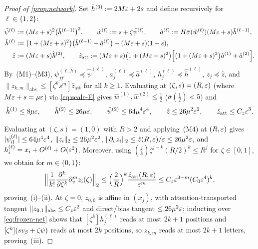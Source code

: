 \begin{proof}[Proof of \cref{prop:network}]
Set $\hat h^{(0)} := 2M\varepsilon + 2s$ and define recursively for $\ell \in \{1,2\}$:
\begin{align*}
  \hat\psi^{(\ell)} &:= (M\varepsilon + s)^2\bigl(\hat h^{(\ell-1)}\bigr)^2, \qquad
  \hat w^{(\ell)} := s + \zeta\hat\psi^{(\ell)}, \qquad
  \hat a^{(\ell)} := H\bar\sigma(\hat w^{(\ell)})(M\varepsilon + s)\hat h^{(\ell-1)},\\
  \hat h^{(\ell)} &:= \bigl(1 + (M\varepsilon + s)^2\bigr)\bigl(\hat h^{(\ell-1)} + \hat a^{(\ell)}\bigr) + (M\varepsilon + s)(1 + s),\\
  \hat z &:= (M\varepsilon + s)\hat h^{(2)}, \qquad
  \hat z_{\mathrm{att}} := (M\varepsilon + s)\bigl(1 + (M\varepsilon + s)^2\bigr)\Bigl[\bigl(1 + (M\varepsilon + s)^2\bigr)\hat a^{(1)} + \hat a^{(2)}\Bigr].
\end{align*}
By~(M1)--(M3), $\psi_{jj'}^{(\ell,h)} \preccurlyeq \hat\psi^{(\ell)}$, $a_j^{(\ell)} \preccurlyeq \hat a^{(\ell)}$, $h_j^{(\ell)} \preccurlyeq \hat h^{(\ell)}$, $z_j \preccurlyeq \hat z$, and $\|z_{k,m}\|_{\mathrm{abs}} \le [\zeta^k s^m]\hat z_{\mathrm{att}}$ for all $k \ge 1$. Evaluating at $(\zeta, s) = (R, \varepsilon)$ (where $M\varepsilon + s = \mu\varepsilon$) via \cref{eq:scale-E} gives $\hat w^{(1)}, \hat w^{(2)} \le \frac{1}{2}$ ($\bar\sigma(\frac{1}{2}) < 5$) and
\[
  \hat h^{(1)} \le 8\mu\varepsilon, \qquad
  \hat h^{(2)} \le 26\mu\varepsilon, \qquad
  \hat\psi^{(2)} \le 64\mu^4\varepsilon^4, \qquad
  \hat z \le 26\mu^2\varepsilon^2, \qquad
  \hat z_{\mathrm{att}} \le C_z\varepsilon^3.
\]

Evaluating at $(\zeta, s) = (1, 0)$ with $R > 2$ and applying~(M4) at $(R, \varepsilon)$ gives $|\psi_{il}^{(\ell)}| \le 64\mu^4\varepsilon^4$, $\|z_i\|_2 \le 26\mu^2\varepsilon^2$, $\|\partial_v z_i\|_2 \le \hat z(R,\varepsilon)/\varepsilon \le 26\mu^2\varepsilon$, and $h_i^{(\ell)} = x_i + O^{(\ell)} + O(\varepsilon^2)$. Moreover, using $\binom{j}{k}\zeta^{j-k}(R/2)^k \le R^j$ for $\zeta \in [0,1]$, we obtain for $m \in \{0,1\}$:
\[
  \Bigl\|\frac{1}{k!}\frac{\partial^k}{\partial\zeta^k}\partial_v^m z_i(\zeta)\Bigr\|_2
  \le \Bigl(\frac{2}{R}\Bigr)^k \frac{\hat z_{\mathrm{att}}(R,\varepsilon)}{\varepsilon^m}
  \le C_z\varepsilon^{3-m}(C_0\varepsilon^4)^k,
\]
proving~(i)--(ii). At $\zeta = 0$, $z_{0,0}$ is affine in $(x_j)$, with attention-transported tangent $\|z_{0,1}\|_{\mathrm{abs}} \le C_z\varepsilon^2$ and direct/bias tangent $\le 26\mu^2\varepsilon$; inducting over \cref{eq:frozen-net} shows that $[\zeta^k]h_j^{(\ell)}$ reads at most $2k+1$ positions and $[\zeta^k](s v_\beta + \zeta\psi)$ reads at most $2k$ positions, so $z_{k,m}$ reads at most $2k + 1$ letters, proving~(iii).


\end{proof}
